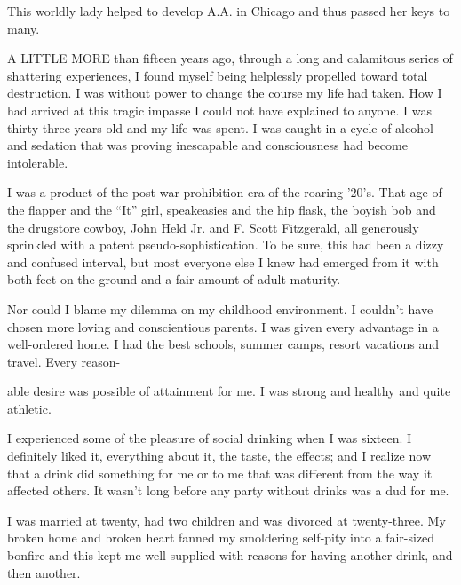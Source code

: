 
\bbChapterPreamble


\begin{biblechapter}
    This worldly lady helped to develop A.A. in Chicago
    and thus passed her keys to many.
\end{biblechapter}


\begin{biblechapter}
    A LITTLE MORE than fifteen years ago, 
    through a long and calamitous series of shattering experiences, 
    I found myself being helplessly propelled 
    toward total destruction.
\verse I was without power to change the course my life had taken.
\verse How I had arrived at this tragic impasse 
    I could not have explained to anyone.
\verse I was thirty-three years old and my life was spent.
\verse I was caught in a cycle of alcohol and sedation 
    that was proving inescapable and consciousness had become intolerable.

\verse I was a product of the post-war prohibition era of the roaring ’20’s. That age of the flapper and the “It” girl, speakeasies and the hip flask, the boyish bob and the drugstore cowboy, John Held Jr. and F. Scott Fitzgerald, all generously sprinkled with a patent pseudo-sophistication. To be sure, this had been a dizzy and confused interval, but most everyone else I knew had emerged from it with both feet on the ground and a fair amount of adult maturity.

Nor could I blame my dilemma on my childhood environment. I couldn’t have chosen more loving and conscientious parents. I was given every advantage in a well-ordered home. I had the best schools, summer camps, resort vacations and travel. Every reason-

able desire was possible of attainment for me. I was strong and healthy and quite athletic.

I experienced some of the pleasure of social drinking when I was sixteen. I definitely liked it, everything about it, the taste, the effects; and I realize now that a drink did something for me or to me that was different from the way it affected others. It wasn’t long before any party without drinks was a dud for me.

I was married at twenty, had two children and was divorced at twenty-three. My broken home and broken heart fanned my smoldering self-pity into a fair-sized bonfire and this kept me well supplied with reasons for having another drink, and then another.


\end{biblechapter}
